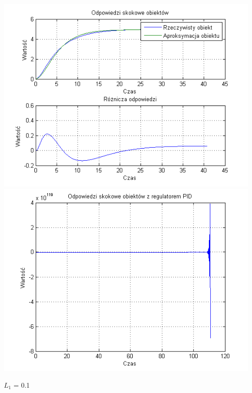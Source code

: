 \documentclass[10pt,a4paper]{article}
\begin{document}
\begin{center}
\includegraphics[scale=1]{images/dwa/skrypt_193.png}\\
\includegraphics[scale=1]{images/dwa/skrypt_194.png}\\
\end{center}
\newpage
$L_1$ = 0.1
\end{document}
